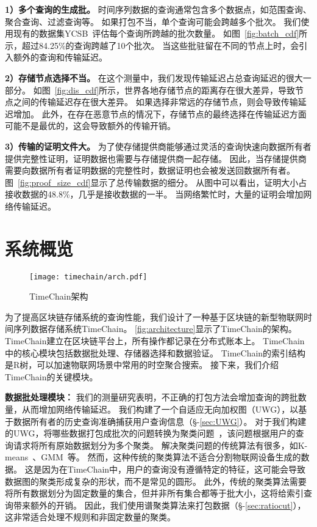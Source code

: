 \textbf{1）多个查询的生成批。}
时间序列数据的查询通常包含多个数据点，如范围查询、聚合查询、过滤查询等。
如果打包不当，单个查询可能会跨越多个批次。
我们使用现有的数据集YCSB~\cite{barata2014ycsb}评估每个查询所跨越的批次数量。
如图~\autoref{fig:batch_cdf}所示，超过84.25\%的查询跨越了10个批次。
当这些批驻留在不同的节点上时，会引入额外的查询和传输延迟。

\textbf{2）存储节点选择不当。}
在这个测量中，我们发现传输延迟占总查询延迟的很大一部分。
如图~\autoref{fig:dis_cdf}所示，世界各地存储节点的距离存在很大差异，导致节点之间的传输延迟存在很大差异。
如果选择非常远的存储节点，则会导致传输延迟增加。
此外，在存在恶意节点的情况下，存储节点的最终选择在传输延迟方面可能不是最优的，这会导致额外的传输开销。

\textbf{3）传输的证明文件大。}
为了使存储提供商能够通过灵活的查询快速向数据所有者提供完整性证明，证明数据也需要与存储提供商一起存储。
因此，当存储提供商需要向数据所有者证明数据的完整性时，数据证明也会被发送回数据所有者。
图~\autoref{fig:proof_size_cdf}显示了总传输数据的细分。
从图中可以看出，证明大小占接收数据的48.8\%，几乎是接收数据的一半。
当网络繁忙时，大量的证明会增加网络传输延迟。

\chapter{系统概览}
\label{sec:design}

\begin{figure}[t]
    \centering
    \texttt{[image: timechain/arch.pdf]}
    \caption{TimeChain架构}
    \label{fig:architecture}
\end{figure}

为了提高区块链存储系统的查询性能，我们设计了一种基于区块链的新型物联网时间序列数据存储系统TimeChain。
\autoref{fig:architecture}显示了TimeChain的架构。
TimeChain建立在区块链平台上，所有操作都记录在分布式账本上。
TimeChain中的核心模块包括数据批处理、存储器选择和数据验证。
TimeChain的索引结构是R树，可以加速物联网场景中常用的时空聚合搜索。
接下来，我们介绍TimeChain的关键模块。

\textbf{数据批处理模块：}
我们的测量研究表明，不正确的打包方法会增加查询的跨批数量，从而增加网络传输延迟。
我们构建了一个自适应无向加权图（UWG），以基于数据所有者的历史查询准确捕获用户查询信息（§-\ref{sec:UWG}）。
对于我们构建的UWG，将哪些数据打包成批次的问题转换为聚类问题~\cite{xu2005survey}，该问题根据用户的查询请求将所有原始数据划分为多个聚类。
解决聚类问题的传统算法有很多，如K-means~\cite{kanungo2002efficient}、GMM~\cite{he2010laplacian}等。
然而，这种传统的聚类算法不适合分割物联网设备生成的数据。
这是因为在TimeChain中，用户的查询没有遵循特定的特征，这可能会导致数据图的聚类形成复杂的形状，而不是常见的圆形。
此外，传统的聚类算法需要将所有数据划分为固定数量的集合，但并非所有集合都等于批大小，这将给索引查询带来额外的开销。
因此，我们使用谱聚类算法来打包数据（§-\ref{sec:ratiocut}），这非常适合处理不规则和非固定数量的聚类。

